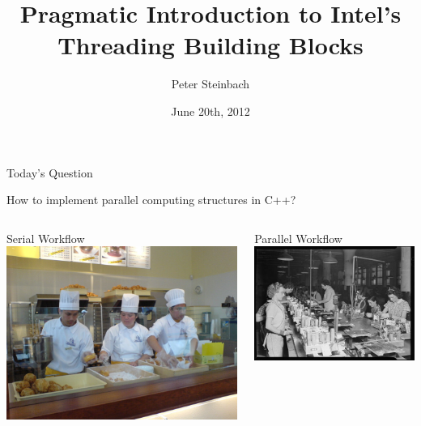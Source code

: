 \documentclass[9pt,pdftex]{beamer}
\begin{document}

\title[TBB]{ Pragmatic Introduction to Intel's Threading Building Blocks }
\author[P. Steinbach]{Peter Steinbach}
\date{June 20th, 2012}


\begin{frame}
  \begin{block}{Today's Question}
    \begin{center}
      How to implement parallel computing structures in C++?
    \end{center}
  \end{block}
  \vfill
  \begin{columns}[t]
    \begin{column}{.45\textwidth}
      \begin{block}{Serial Workflow}
        \includegraphics[width=.9\textwidth]{img/Cream_puff_assembly_line}\cite{Wikicommons}
      \end{block}
    \end{column}
    \begin{column}{.45\textwidth}
      \begin{block}{Parallel  Workflow}
      \includegraphics[width=.9\textwidth]{img/RadioAssembly}\cite{Wikicommons}

\end{block}
\end{column}
\end{columns}
\end{frame}
\end{document}
